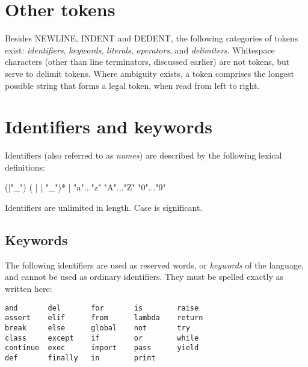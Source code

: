 \section{Other tokens\label{other-tokens}}

Besides NEWLINE, INDENT and DEDENT, the following categories of tokens
exist: \emph{identifiers}, \emph{keywords}, \emph{literals},
\emph{operators}, and \emph{delimiters}.
Whitespace characters (other than line terminators, discussed earlier)
are not tokens, but serve to delimit tokens.
Where
ambiguity exists, a token comprises the longest possible string that
forms a legal token, when read from left to right.


\section{Identifiers and keywords\label{identifiers}}

Identifiers (also referred to as \emph{names}) are described by the following
lexical definitions:

\begin{productionlist}
             {(|"_") ( |  | "_")*}
             { | }
             {"a"..."z"}
             {"A"..."Z"}
             {"0"..."9"}
\end{productionlist}

Identifiers are unlimited in length.  Case is significant.


\subsection{Keywords\label{keywords}}

The following identifiers are used as reserved words, or
\emph{keywords} of the language, and cannot be used as ordinary
identifiers.  They must be spelled exactly as written here:%
%

\begin{verbatim}
and       del       for       is        raise    
assert    elif      from      lambda    return   
break     else      global    not       try      
class     except    if        or        while    
continue  exec      import    pass      yield    
def       finally   in        print              
\end{verbatim}


